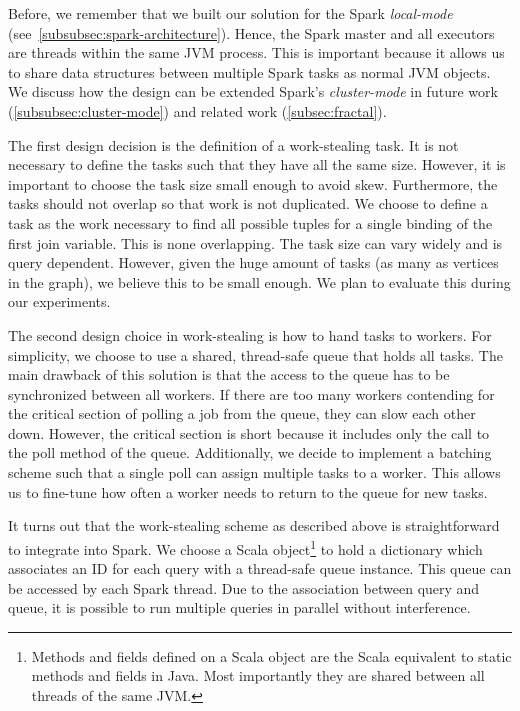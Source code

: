 Before, we remember that we built our solution for the Spark \textit{local-mode} (see~\cref{subsubsec:spark-architecture}).
Hence, the Spark master and all executors are threads within the same JVM process.
This is important because it allows us to share data structures between multiple Spark tasks as normal JVM objects.
We discuss how the design can be extended Spark's \textit{cluster-mode} in future work (\cref{subsubsec:cluster-mode}) and
related work (\cref{subsec:fractal}).

The first design decision is the definition of a work-stealing task.
It is not necessary to define the tasks such that they have all the same size.
However, it is important to choose the task size small enough to avoid skew.
Furthermore, the tasks should not overlap so that work is not duplicated.
We choose to define a task as the work necessary to find all possible tuples for a single binding of the first join variable.
This is none overlapping.
The task size can vary widely and is query dependent.
However, given the huge amount of tasks (as many as vertices in the graph), we believe this to be small enough.
We plan to evaluate this during our experiments.

The second design choice in work-stealing is how to hand tasks to workers.
For simplicity, we choose to use a shared, thread-safe queue that holds all tasks.
The main drawback of this solution is that the access to the queue has to be synchronized between all workers.
If there are too many workers contending for the critical section of polling a job from the queue, they can slow each other down.
However, the critical section is short because it includes only the call to the poll method of the queue.
Additionally, we decide to implement a batching scheme such that a single poll can assign multiple tasks to a worker.
This allows us to fine-tune how often a worker needs to return to the queue for new tasks.

It turns out that the work-stealing scheme as described above is straightforward to integrate into Spark.
We choose a Scala object\footnote{Methods and fields defined on a Scala object are the Scala equivalent to static methods and fields in
Java. Most importantly they are shared between all threads of the same JVM.} to hold a dictionary which associates an ID for each
query with a thread-safe queue instance.
This queue can be accessed by each Spark thread.
Due to the association between query and queue, it is possible to run multiple queries in parallel without interference.


